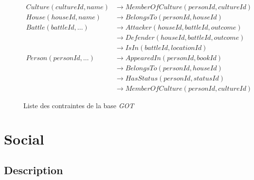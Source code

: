 \begin{figure}[H]
    \ContinuedFloat
    \centering
    \begin{adjustbox}{max width=\linewidth,max height=.5\textheight}
        \parbox{\linewidth}{\begin{align*}
                Culture(cultureId, name) & \to MemberOfCulture(personId, cultureId) \\
                House(houseId, name)     & \to BelongsTo(personId, houseId)         \\
                Battle(battleId, \dots)  & \to Attacker(houseId, battleId, outcome) \\
                                         & \to Defender(houseId, battleId, outcome) \\
                                         & \to IsIn(battleId, locationId)           \\
                Person(personId, \dots)  & \to AppearedIn(personId, bookId)         \\
                                         & \to BelongsTo(personId, houseId)         \\
                                         & \to HasStatus(personId, statusId)        \\
                                         & \to MemberOfCulture(personId, cultureId)
            \end{align*}}
    \end{adjustbox}
    \caption{Liste des contraintes de la base \emph{GOT}}
\end{figure}

\section{Social}

\subsection{Description}

